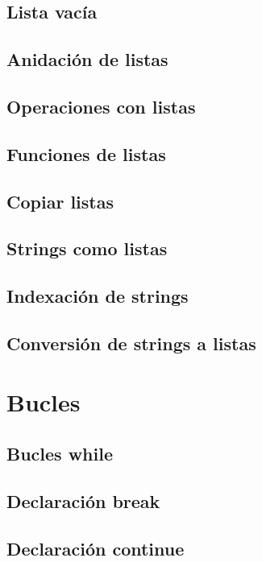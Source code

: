\documentclass{article}
\begin{document}
\subsection{Lista vacía}

\subsection{Anidación de listas}

\subsection{Operaciones con listas}

\subsection{Funciones de listas}

\subsection{Copiar listas}

\subsection{Strings como listas}

\subsection{Indexación de strings}

\subsection{Conversión de strings a listas}

\section{Bucles}

\subsection{Bucles while}

\subsection{Declaración break}

\subsection{Declaración continue}
\end{document}
